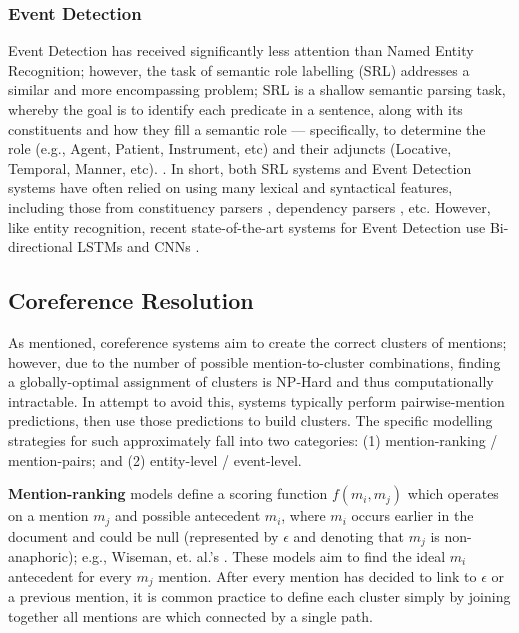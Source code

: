 \subsubsection{Event Detection}
Event Detection has received significantly less attention than Named Entity Recognition; however, the task of semantic role labelling (SRL) addresses a similar and more encompassing problem; SRL is a shallow semantic parsing task, whereby the goal is to identify each predicate in a sentence, along with its constituents and how they fill a semantic role --- specifically, to determine the role (e.g., Agent, Patient, Instrument, etc) and their adjuncts (Locative, Temporal, Manner, etc). \cite{Punyakanok:2008:ISP:1403157.1403162, Gildea:2002:ALS:643092.643093}.  In short, both SRL systems and Event Detection systems have often relied on using many lexical and syntactical features, including those from constituency parsers \cite{Toutanova:2005:JLI:1219840.1219913}, dependency parsers \cite{Johansson:2007:LSS:1621474.1621522}, etc.
However, like entity recognition, recent state-of-the-art systems for Event Detection use Bi-directional LSTMs and CNNs \cite{Feng2016ALN}.

\subsection{Coreference Resolution}
As mentioned, coreference systems aim to create the correct clusters of mentions; however, due to the number of possible mention-to-cluster combinations, finding a globally-optimal assignment of clusters is NP-Hard and thus computationally intractable.  In attempt to avoid this, systems typically perform pairwise-mention predictions, then use those predictions to build clusters. The specific modelling strategies for such approximately fall into two categories: (1) mention-ranking / mention-pairs; and (2) entity-level / event-level.

\textbf{Mention-ranking} models define a scoring function $f(m_i,m_j)$ which operates on a mention $m_j$ and possible antecedent $m_i$, where $m_i$ occurs earlier in the document and could be null (represented by $\epsilon$ and denoting that $m_j$ is non-anaphoric); e.g., Wiseman, et. al.'s \cite{DBLP:conf/acl/WisemanRSW15}.  These models aim to find the ideal $m_i$ antecedent for every $m_j$ mention.  After every mention has decided to link to $\epsilon$ or a previous mention, it is common practice to define each cluster simply by joining together all mentions are which connected by a single path.


